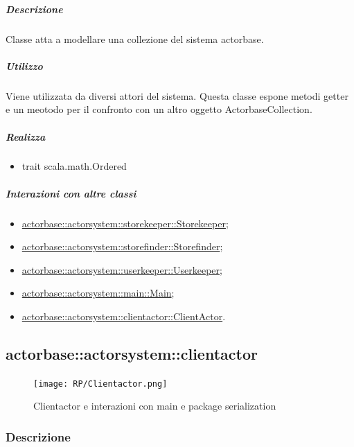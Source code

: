 \documentclass{scalatekids-article}
\begin{document}
\subparagraph{Descrizione}
Classe atta a modellare una collezione del sistema actorbase.

\subparagraph{Utilizzo}
Viene utilizzata da diversi attori del sistema. Questa classe espone metodi
getter e un meotodo per il confronto con un altro oggetto ActorbaseCollection.

\subparagraph{Realizza}
\begin{itemize}
\item trait scala.math.Ordered
\end{itemize}

\subparagraph{Interazioni con altre classi}

\begin{itemize}
\item \hyperref[sec:actorbase::actorsystem::storekeeper::Storekeeper]{actorbase::actorsystem::storekeeper::Storekeeper};
\item \hyperref[sec:actorbase::actorsystem::storefinder::Storefinder]{actorbase::actorsystem::storefinder::Storefinder};
\item \hyperref[sec:actorbase::actorsystem::userkeeper::Userkeeper]{actorbase::actorsystem::userkeeper::Userkeeper};
\item \hyperref[sec:actorbase::actorsystem::main::Main]{actorbase::actorsystem::main::Main};
\item \hyperref[sec:actorbase::actorsystem::clientactor::ClientActor]{actorbase::actorsystem::clientactor::ClientActor}.
\end{itemize}


\subsection{actorbase::actorsystem::clientactor}
\label{sec:actorbase::actorsystem::clientactor}

\begin{figure}[H]
  \begin{center}
    \texttt{[image: RP/Clientactor.png]}
    \caption{Clientactor e interazioni con main e package serialization}
  \end{center}
\end{figure}

\subsubsection{Descrizione}
\end{document}
